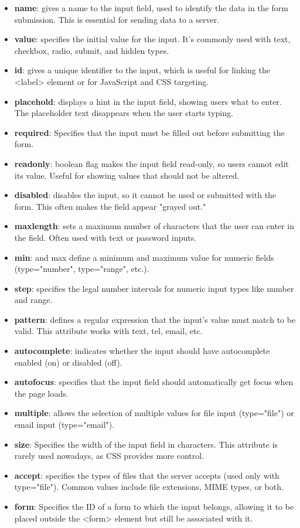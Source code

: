 \documentclass{report}
\begin{document}
        \begin{itemize}
            \item \textbf{name}:  gives a name to the input field, used to identify the data in the form submission. This is essential for sending data to a server.
            \item \textbf{value}:  specifies the initial value for the input. It’s commonly used with text, checkbox, radio, submit, and hidden types.
            \item \textbf{id}:  gives a unique identifier to the input, which is useful for linking the <label> element or for JavaScript and CSS targeting.
            \item \textbf{placehold}:  displays a hint in the input field, showing users what to enter. The placeholder text disappears when the user starts typing.
            \item \textbf{required}:  Specifies that the input must be filled out before submitting the form.
            \item \textbf{readonly}: boolean flag makes the input field read-only, so users cannot edit its value. Useful for showing values that should not be altered.
            \item \textbf{disabled}: disables the input, so it cannot be used or submitted with the form. This often makes the field appear "grayed out."
            \item \textbf{maxlength}: sets a maximum number of characters that the user can enter in the field. Often used with text or password inputs.
            \item \textbf{min}: and max define a minimum and maximum value for numeric fields (type="number", type="range", etc.).
            \item \textbf{step}: specifies the legal number intervals for numeric input types like number and range.
            \item \textbf{pattern}: defines a regular expression that the input’s value must match to be valid. This attribute works with text, tel, email, etc.
            \item \textbf{autocomplete}: indicates whether the input should have autocomplete enabled (on) or disabled (off).
            \item \textbf{autofocus}: specifies that the input field should automatically get focus when the page loads.
            \item \textbf{multiple}: allows the selection of multiple values for file input (type="file") or email input (type="email").
            \item \textbf{size}: Specifies the width of the input field in characters. This attribute is rarely used nowadays, as CSS provides more control.
            \item \textbf{accept}: specifies the types of files that the server accepts (used only with type="file"). Common values include file extensions, MIME types, or both.
            \item \textbf{form}: Specifies the ID of a form to which the input belongs, allowing it to be placed outside the <form> element but still be associated with it.
        \end{itemize}
\end{document}

